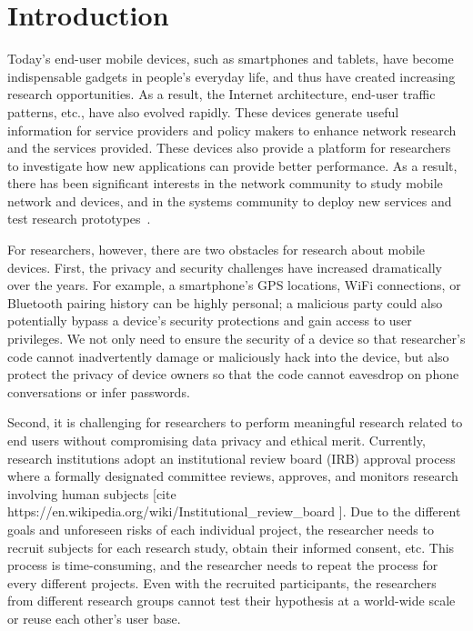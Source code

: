 \section{Introduction}

Today's end-user mobile devices, such as smartphones and
tablets, have become indispensable gadgets in people's everyday
life, and thus have created increasing research opportunities.
As a result, the Internet architecture, end-user traffic
patterns, etc., have also evolved rapidly. These devices
generate useful information for service providers and policy
makers to enhance network research and the services provided.
These devices also provide a platform for researchers to
investigate how new applications can provide better performance.
As a result, there has been significant interests in the network
community to study mobile network and devices, and in the
systems community to deploy new services and test research
prototypes~\cite{nikravesh2015mobilyzer}.
					
For researchers, however, there are two obstacles for research
about mobile devices. First, the privacy and security challenges
have increased dramatically over the years.  For example, a smartphone's GPS locations,
WiFi connections, or Bluetooth pairing history can be highly
personal; a malicious party could also potentially bypass a
device's security protections and gain access to user
privileges. We not only need to ensure the security of a device
so that researcher's code cannot inadvertently damage or
maliciously hack into the device, but also protect the privacy
of device owners so that the code cannot eavesdrop on phone
conversations or infer passwords.

Second, it is challenging for researchers to perform meaningful
research related to end users without compromising data privacy
and ethical merit. Currently, research institutions adopt an
institutional review board (IRB) approval process where a
formally designated committee reviews, approves, and monitors
research involving human subjects [cite
https://en.wikipedia.org/wiki/Institutional\_review\_board ].
Due to the different goals and unforeseen risks of each
individual project, the researcher needs to recruit subjects for
each research study, obtain their informed consent, etc. This
process is time-consuming, and the researcher needs to repeat
the process for every different projects. Even with the
recruited participants, the researchers from different research
groups cannot test their hypothesis at a world-wide scale or
reuse each other's user base.
					
